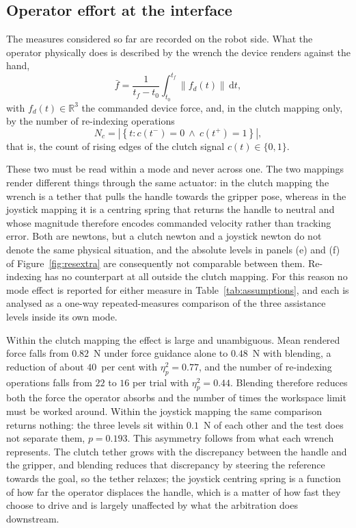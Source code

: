 \subsection{Operator effort at the interface}
\label{sec:reseffort}

The measures considered so far are recorded on the robot side. What the operator physically does is described by the wrench the device renders against the hand,
\begin{equation}
\bar{f} = \frac{1}{t_f-t_0} \int_{t_0}^{t_f} \lVert f_d(t) \rVert \, \mathrm{d}t,
\label{eq:mf}
\end{equation}
with $f_d(t) \in \mathbb{R}^3$ the commanded device force, and, in the clutch mapping only, by the number of re-indexing operations
\begin{equation}
N_c = \left| \left\{ t : c(t^-) = 0 \ \wedge \ c(t^+) = 1 \right\} \right|,
\label{eq:mNc}
\end{equation}
that is, the count of rising edges of the clutch signal $c(t) \in \{0,1\}$.

These two must be read within a mode and never across one. The two mappings render different things through the same actuator: in the clutch mapping the wrench is a tether that pulls the handle towards the gripper pose, whereas in the joystick mapping it is a centring spring that returns the handle to neutral and whose magnitude therefore encodes commanded velocity rather than tracking error. Both are newtons, but a clutch newton and a joystick newton do not denote the same physical situation, and the absolute levels in panels (e) and (f) of Figure~\ref{fig:resextra} are consequently not comparable between them. Re-indexing has no counterpart at all outside the clutch mapping. For this reason no mode effect is reported for either measure in Table~\ref{tab:assumptions}, and each is analysed as a one-way repeated-measures comparison of the three assistance levels inside its own mode.

Within the clutch mapping the effect is large and unambiguous. Mean rendered force falls from $0.82$~N under force guidance alone to $0.48$~N with blending, a reduction of about $40$~per cent with $\eta^2_p = 0.77$, and the number of re-indexing operations falls from $22$ to $16$ per trial with $\eta^2_p = 0.44$. Blending therefore reduces both the force the operator absorbs and the number of times the workspace limit must be worked around. Within the joystick mapping the same comparison returns nothing: the three levels sit within $0.1$~N of each other and the test does not separate them, $p = 0.193$. This asymmetry follows from what each wrench represents. The clutch tether grows with the discrepancy between the handle and the gripper, and blending reduces that discrepancy by steering the reference towards the goal, so the tether relaxes; the joystick centring spring is a function of how far the operator displaces the handle, which is a matter of how fast they choose to drive and is largely unaffected by what the arbitration does downstream.







